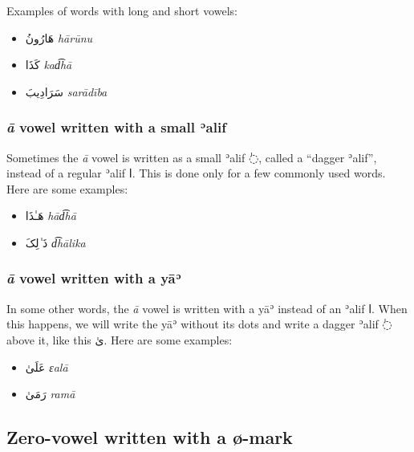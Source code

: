 \documentclass[
  10pt,
]{book}
\providecommand{\tightlist}{%
  \setlength{\itemsep}{0pt}\setlength{\parskip}{0pt}}
\begin{document}
Examples of words with long and short vowels:

\begin{itemize}
\tightlist
\item
  \foreignlanguage{arabic}{هَارُونُ} \emph{hārūnu}
\item
  \foreignlanguage{arabic}{کَذَا} \emph{kad͡hā}
\item
  \foreignlanguage{arabic}{سَرَادِيبَ} \emph{sarādība}
\end{itemize}

\subsubsection{\texorpdfstring{\emph{ā} vowel written with a small ʾalif}{ā vowel written with a small ʾalif}}\label{a-vowel-written-with-a-small-ealif}

Sometimes the \emph{ā} vowel is written as a small ʾalif \foreignlanguage{arabic}{◌ٰ}, called a \enquote{dagger ʾalif}, instead of a regular ʾalif \foreignlanguage{arabic}{ا}. This is done only for a few commonly used words. Here are some examples:

\begin{itemize}
\tightlist
\item
  \foreignlanguage{arabic}{هَـٰذَا} \emph{hād͡hā}
\item
  \foreignlanguage{arabic}{ذَ~ٰلِکَ} \emph{d͡hālika}
\end{itemize}

\subsubsection{\texorpdfstring{\emph{ā} vowel written with a yāʾ}{ā vowel written with a yāʾ}}\label{a-vowel-written-with-a-ya}

In some other words, the \emph{ā} vowel is written with a yāʾ instead of an ʾalif \foreignlanguage{arabic}{ا}. When this happens, we will write the yāʾ without its dots and write a dagger ʾalif \foreignlanguage{arabic}{◌ٰ} above it, like this \foreignlanguage{arabic}{ىٰ}. Here are some examples:

\begin{itemize}
\tightlist
\item
  \foreignlanguage{arabic}{عَلَىٰ} \emph{ɛalā}
\item
  \foreignlanguage{arabic}{رَمَىٰ} \emph{ramā}
\end{itemize}

\subsection{Zero-vowel written with a ø-mark}\label{zero-vowel-written-with-a-0-mark}
\end{document}
